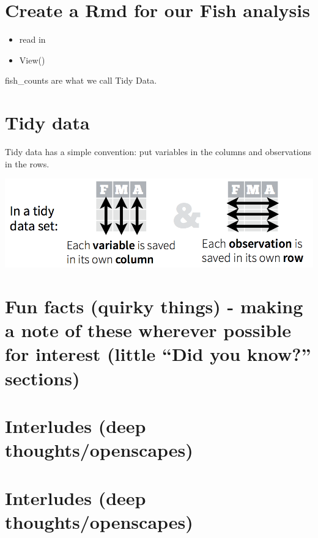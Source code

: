 \documentclass[]{book}
\providecommand{\tightlist}{%
  \setlength{\itemsep}{0pt}\setlength{\parskip}{0pt}}
\begin{document}
\hypertarget{create-a-rmd-for-our-fish-analysis}{%
\section{Create a Rmd for our Fish analysis}\label{create-a-rmd-for-our-fish-analysis}}

\begin{itemize}
\tightlist
\item
  read in
\item
  View()
\end{itemize}

fish\_counts are what we call Tidy Data.

\hypertarget{tidy-data}{%
\section{Tidy data}\label{tidy-data}}

Tidy data has a simple convention: put variables in the columns and observations in the rows.

\includegraphics{img/tidy_data.png}

\hypertarget{fun-facts-quirky-things---making-a-note-of-these-wherever-possible-for-interest-little-did-you-know-sections}{%
\section{Fun facts (quirky things) - making a note of these wherever possible for interest (little ``Did you know?'' sections)}\label{fun-facts-quirky-things---making-a-note-of-these-wherever-possible-for-interest-little-did-you-know-sections}}

\hypertarget{interludes-deep-thoughtsopenscapes-1}{%
\section{Interludes (deep thoughts/openscapes)}\label{interludes-deep-thoughtsopenscapes-1}}

\hypertarget{interludes-deep-thoughtsopenscapes-2}{%
\section{Interludes (deep thoughts/openscapes)}\label{interludes-deep-thoughtsopenscapes-2}}
\end{document}
